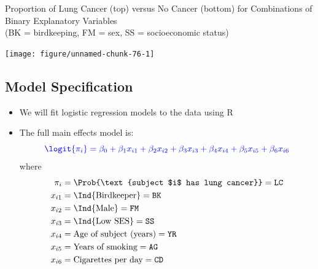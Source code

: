 \documentclass[oneside]{book}\usepackage[]{graphicx}\usepackage[svgnames]{xcolor}
\newenvironment{knitrout}{}{} %
\begin{document}
\begin{center}
      Proportion of Lung Cancer (top) versus No Cancer (bottom) for Combinations of Binary Explanatory Variables\\
      (BK = birdkeeping, FM = sex, SS = socioeconomic status)
\end{center}
\begin{knitrout}
\color{fgcolor}

{\centering \texttt{[image: figure/unnamed-chunk-76-1]} 

}


\end{knitrout}

\subsection*{Model Specification}
\begin{itemize}
      \item We will fit logistic regression models to the data using R
      \item The full main effects model is:
            \[ \textcolor{Blue}{\logit{\pi_i}=\beta_0+\beta_1x_{i1}+\beta_2x_{i2}+\beta_3x_{i3}+\beta_4x_{i4}+\beta_5x_{i5}+\beta_6x_{i6}} \]
            where
            \begin{align*}
                  \pi_i  & =\Prob{\text{subject $i$ has lung cancer}}=\texttt{LC} \\
                  x_{i1} & =\Ind{\text{Birdkeeper}}=\texttt{BK}                   \\
                  x_{i2} & =\Ind{\text{Male}}=\texttt{FM}                         \\
                  x_{i3} & =\Ind{\text{Low SES}}=\texttt{SS}                      \\
                  x_{i4} & =\text{Age of subject (years)}=\texttt{YR}             \\
                  x_{i5} & =\text{Years of smoking}=\texttt{AG}                   \\
                  x_{i6} & =\text{Cigarettes per day}=\texttt{CD}                 \\
            \end{align*}
\end{itemize}
\end{document}
